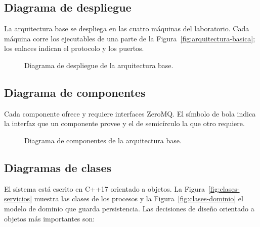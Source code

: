 \subsection{Diagrama de despliegue}
\label{sec:despliegue}

La arquitectura base se despliega en las cuatro máquinas del laboratorio. Cada
máquina corre los ejecutables de una parte de la Figura~\ref{fig:arquitectura-basica};
los enlaces indican el protocolo y los puertos.

\begin{figure}[H]
    \centering
    \resizebox{\textwidth}{!}{}
    \caption{Diagrama de despliegue de la arquitectura base.}
    \label{fig:despliegue}
\end{figure}

\subsection{Diagrama de componentes}

Cada componente ofrece y requiere interfaces ZeroMQ. El símbolo de bola indica la
interfaz que un componente provee y el de semicírculo la que otro requiere.

\begin{figure}[H]
    \centering
    \resizebox{!}{0.62\textheight}{}
    \caption{Diagrama de componentes de la arquitectura base.}
    \label{fig:componentes}
\end{figure}

\subsection{Diagramas de clases}

El sistema está escrito en C++17 orientado a objetos. La
Figura~\ref{fig:clases-servicios} muestra las clases de los procesos y la
Figura~\ref{fig:clases-dominio} el modelo de dominio que guarda persistencia.
Las decisiones de diseño orientado a objetos más importantes son:

